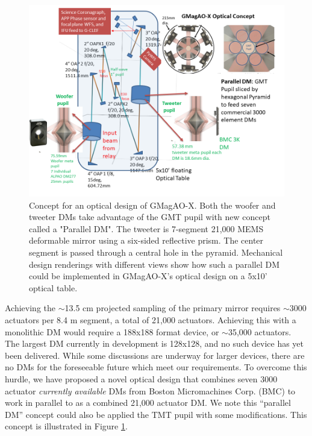 \documentclass[12pt,preprint]{aastex}
\begin{document}
\begin{figure} [h!]
\centering
\includegraphics[width=5in]{figures/Possible_Optical_design_GMagAOX_V2.png}
\vspace{-0.2in}
\caption{ Concept for an optical design of GMagAO-X. Both the woofer and tweeter DMs take advantage of the GMT pupil with new concept called a "Parallel DM". The tweeter is 7-segment 21,000 MEMS deformable mirror using a six-sided reflective prism. The center segment is passed through a central hole in the pyramid. Mechanical design renderings with different views show how such a parallel DM could be implemented in GMagAO-X's optical design on a 5x10' optical table.  \label{fig:pardm}}
\vspace{-0.1in}
\end{figure}

Achieving the $\sim$13.5 cm projected sampling of the primary mirror requires $\sim$3000 actuators per 8.4 m segment, a total of 21,000 actuators.   Achieving this with a monolithic DM would require a 188x188 format device, or $\sim$35,000 actuators. The largest DM currently in development is 128x128, and no such device has yet been delivered.  While some discussions are underway for larger devices, there are no DMs for the foreseeable future which meet our requirements. To overcome this hurdle, we have proposed a novel optical design that combines seven 3000 actuator \textit{currently available} DMs from Boston Micromachines Corp. (BMC) to work in parallel to as a combined 21,000 actuator DM. We note this ``parallel DM'' concept could also be applied the TMT pupil with some modifications.  This concept is illustrated in Figure \ref{fig:pardm}.
\end{document}
